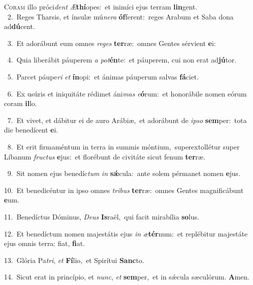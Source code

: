 \lettrine{\initial\textcolor{\initialcolor}{C}}{oram} illo próci\textit{dent} \textit{Æ}\-\textbf{thí}opes:~\star et inimíci ejus terram \textbf{lin}\-gent.\\
{\numbfont\textcolor{\numbcolor}{~2.}}~Reges Tharsis, et ínsulæ mú\-\textit{ne}\-\textit{ra} \textbf{óf}\-ferent:~\star reges Arabum et Saba dona ad\-\textbf{dú}\-cent.\par
{\numbfont\textcolor{\numbcolor}{~3.}}~Et adorábunt eum omnes \textit{re}\-\textit{ges} \textbf{ter}\-ræ:~\star omnes Gentes sérvient \textbf{e}\-i:\par
{\numbfont\textcolor{\numbcolor}{~4.}}~Quia liberábit páuperem \textit{a} \textit{pot}\-\textbf{én}te:~\star et páuperem, cui non erat ad\-\textbf{jú}\-tor.\par
{\numbfont\textcolor{\numbcolor}{~5.}}~Parcet páupe\textit{ri} \textit{et} \textbf{ín}\-opi:~\star et ánimas páuperum salvas \textbf{fá}\-ciet.\par
{\numbfont\textcolor{\numbcolor}{~6.}}~Ex usúris et iniquitáte rédimet áni\textit{mas} \textit{e}\-\textbf{ó}rum:~\star et honorábile nomen eórum coram \textbf{il}\-lo.\par
{\numbfont\textcolor{\numbcolor}{~7.}}~Et vivet, et dábitur ei de auro Arábiæ,~\dagger et adorábunt de \textit{ip}\-\textit{so} \textbf{sem}\-per:~\star tota die benedícent \textbf{e}\-i.\par
{\numbfont\textcolor{\numbcolor}{~8.}}~Et erit firmaméntum in terra in summis móntium,~\dagger superextollétur super Líbanum \textit{fruc}\-\textit{tus} \textbf{e}\-jus:~\star et florébunt de civitáte sicut fenum \textbf{ter}\-ræ.\par
{\numbfont\textcolor{\numbcolor}{~9.}}~Sit nomen ejus benedíc\textit{tum} \textit{in} \textbf{sǽ}\-cula:~\star ante solem pérmanet nomen \textbf{e}\-jus.\par
{\numbfont\textcolor{\numbcolor}{10.}}~Et benedicéntur in ipso omnes \textit{tri}\-\textit{bus} \textbf{ter}\-ræ:~\star omnes Gentes magnificábunt \textbf{e}\-um.\par
{\numbfont\textcolor{\numbcolor}{11.}}~Benedíctus Dóminus, \textit{De}\-\textit{us} \textbf{Is}\-raël,~\star qui facit mirabília \textbf{so}\-lus.\par
{\numbfont\textcolor{\numbcolor}{12.}}~Et benedíctum nomen majestátis ejus \textit{in} \textit{æ}\-\textbf{tér}num:~\star et replébitur majestáte ejus omnis terra: fiat, \textbf{fi}\-at.\par
{\numbfont\textcolor{\numbcolor}{13.}}~Glória Pa\-\textit{tri}\-, \textit{et} \textbf{Fí}\-lio,~\star et Spirítui \textbf{Sanc}\-to.\par
{\numbfont\textcolor{\numbcolor}{14.}}~Sicut erat in princípio, et \textit{nunc}\-, \textit{et} \textbf{sem}\-per,~\star et in sǽcula sæculórum. \textbf{A}\-men.\par
